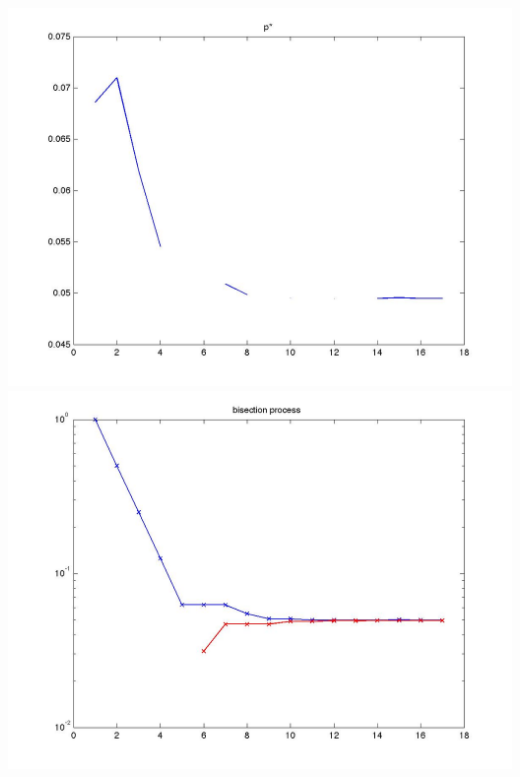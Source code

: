 \documentclass[12pt,a4paper]{article}
\begin{document}
\begin{center}
\includegraphics[scale = 0.18]{A79_pstar.jpg}
\includegraphics[scale = 0.18]{A79_bisection.jpg}
\end{center}
\end{document}
